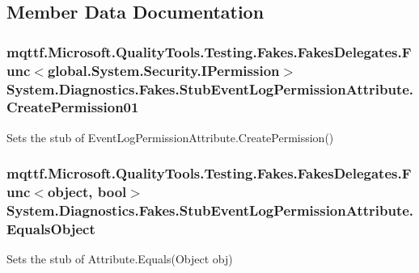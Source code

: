 \subsection{Member Data Documentation}
\hypertarget{class_system_1_1_diagnostics_1_1_fakes_1_1_stub_event_log_permission_attribute_a09f3e4c16e0a897268e4edf8af09f606}{
\subsubsection[{Create\-Permission01}]{\setlength{\rightskip}{0pt plus 5cm}mqttf.\-Microsoft.\-Quality\-Tools.\-Testing.\-Fakes.\-Fakes\-Delegates.\-Func$<$global.\-System.\-Security.\-I\-Permission$>$ System.\-Diagnostics.\-Fakes.\-Stub\-Event\-Log\-Permission\-Attribute.\-Create\-Permission01}}\label{class_system_1_1_diagnostics_1_1_fakes_1_1_stub_event_log_permission_attribute_a09f3e4c16e0a897268e4edf8af09f606}


Sets the stub of Event\-Log\-Permission\-Attribute.\-Create\-Permission()

\hypertarget{class_system_1_1_diagnostics_1_1_fakes_1_1_stub_event_log_permission_attribute_abe266897789eabf77da57ae79c63a3ce}{
\subsubsection[{Equals\-Object}]{\setlength{\rightskip}{0pt plus 5cm}mqttf.\-Microsoft.\-Quality\-Tools.\-Testing.\-Fakes.\-Fakes\-Delegates.\-Func$<$object, bool$>$ System.\-Diagnostics.\-Fakes.\-Stub\-Event\-Log\-Permission\-Attribute.\-Equals\-Object}}\label{class_system_1_1_diagnostics_1_1_fakes_1_1_stub_event_log_permission_attribute_abe266897789eabf77da57ae79c63a3ce}


Sets the stub of Attribute.\-Equals(\-Object obj)

